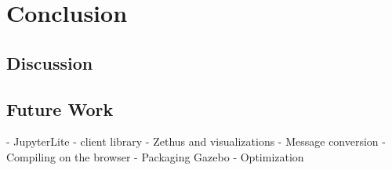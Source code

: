 \chapter{Conclusion}

\section{Discussion}

\section{Future Work}

- JupyterLite
- client library
- Zethus and visualizations
- Message conversion
- Compiling on the browser
- Packaging Gazebo
- Optimization